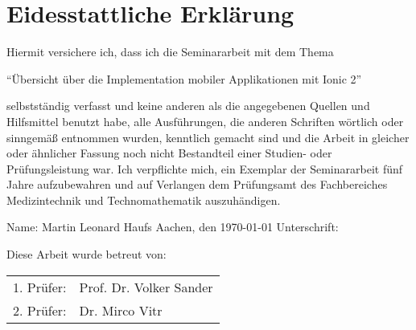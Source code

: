 \chapter*{Eidesstattliche Erklärung}
Hiermit versichere ich, dass ich die Seminararbeit mit dem Thema 
\begin{center}
    \enquote{Übersicht über die Implementation mobiler Applikationen mit Ionic 2}
\end{center}
selbstständig verfasst und keine anderen als die angegebenen Quellen und Hilfsmittel benutzt habe, alle Ausführungen, die anderen Schriften wörtlich oder sinngemäß entnommen wurden, kenntlich gemacht sind und die Arbeit in gleicher oder ähnlicher Fassung noch nicht Bestandteil einer Studien- oder Prüfungsleistung war. Ich verpflichte mich, ein Exemplar der Seminararbeit fünf Jahre aufzubewahren und auf Verlangen dem Prüfungsamt des Fachbereiches Medizintechnik und Technomathematik auszuhändigen. 
\linebreak
\linebreak
\begin{flushleft}
    Name: Martin Leonard Haufs
    \linebreak 
    Aachen, den \today
    \linebreak	
    \linebreak
    Unterschrift: \underline{\hspace{5cm}}
    	
    \vspace{2.0cm}
    Diese Arbeit wurde betreut von: \linebreak
    
    \begin{tabular*}{\linewidth}{ll}
    	1. Prüfer: & Prof. Dr. Volker Sander\\
    	2. Prüfer: & Dr. Mirco Vitr
    \end{tabular*}

\end{flushleft}